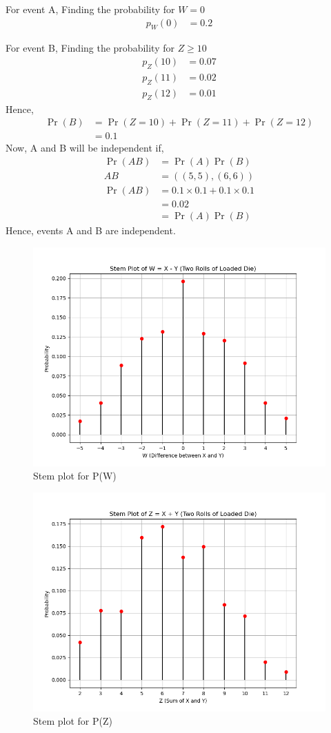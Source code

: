 \documentclass[]{article}
\begin{document}
For event A,
Finding the probability for $W = 0$
\begin{align}
	p_W(0) &= 0.2 
\end{align}

For event B,
Finding the probability for $Z\geq 10$
\begin{align}
p_Z(10) &= 0.07\\
p_Z(11) &= 0.02\\
p_Z(12) &= 0.01
\end{align}
Hence,
\begin{align}
\Pr(B) &= \Pr(Z=10) + \Pr(Z=11) + \Pr(Z=12)\\
&= 0.1
\end{align}
Now, A and B will be independent if,
\begin{align}
\Pr(AB) &= \Pr(A)\Pr(B)\\
AB &= ((5,5), (6,6)) \\
\Pr(AB) &= 0.1 \times 0.1 + 0.1 \times 0.1\\
&= 0.02\\
&= \Pr(A)\Pr(B)
\end{align}
Hence, events A and B are independent.
\begin{figure}
\includegraphics[width=\columnwidth]{./figs/W.png}
\caption{Stem plot for P(W)}
\label{fig:exemplar/12/13/3/1/W/}
\end{figure}
\begin{figure}
\includegraphics[width=\columnwidth]{./figs/Z.png}
\caption{Stem plot for P(Z)}
\label{fig:exemplar/12/13/3/1/Z/}
\end{figure}
\end{document}
